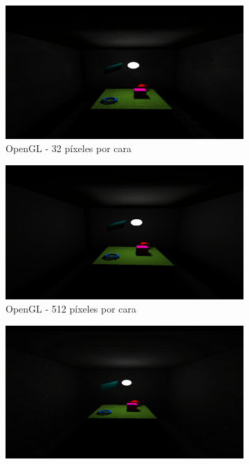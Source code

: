 \begin{figure}[htbp]
	\centering
	\begin{subfigure}{0.45\textwidth}
		\includegraphics[width=1\linewidth]{assets/32sgl}
		\caption{OpenGL - 32 píxeles por cara}
	\end{subfigure}
	\begin{subfigure}{0.45\textwidth}
		\includegraphics[width=1\linewidth]{assets/512sgl}
		\caption{OpenGL - 512 píxeles por cara}
	\end{subfigure}
	\begin{subfigure}{0.45\textwidth}
		\includegraphics[width=1\linewidth]{assets/32srt}

\end{subfigure}
\end{figure}
